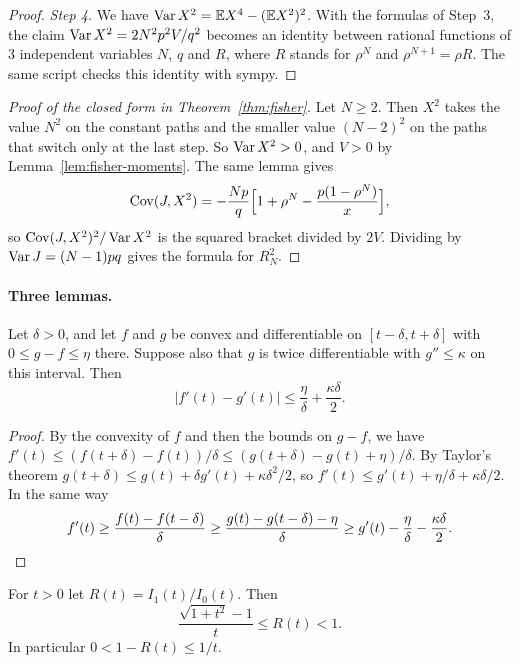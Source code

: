 \begin{proof}
\emph{Step 4.} We have $\operatorname{Var} X^2=\mathbb{E} X^4-(\mathbb{E} X^2)^2$. With the formulas of
Step~3, the claim $\operatorname{Var} X^2=2N^2p^2V/q^2$ becomes an identity between
rational functions of 3 independent variables $N$, $q$ and $R$, where $R$
stands for $\rho^N$ and $\rho^{N+1}=\rho R$. The same script checks this
identity with sympy.
\end{proof}

\begin{proof}[Proof of the closed form in Theorem~\ref{thm:fisher}]
Let $N\ge2$. Then $X^2$ takes the value $N^2$ on the constant paths and the
smaller value $(N-2)^2$ on the paths that switch only at the last step. So
$\operatorname{Var} X^2>0$, and $V>0$ by Lemma~\ref{lem:fisher-moments}. The same lemma
gives
\[
 \operatorname{Cov}(J,X^2)=-\frac{Np}q\Bigl[1+\rho^N-\frac{p(1-\rho^N)}x\Bigr],
\]
so $\operatorname{Cov}(J,X^2)^2/\operatorname{Var} X^2$ is the squared bracket divided by $2V$. Dividing
by $\operatorname{Var} J=(N-1)pq$ gives the formula for $R^2_N$.
\end{proof}

\paragraph{Three lemmas.}

\begin{lemma}[convexity]\label{lem:fisher-convex}
Let $\delta>0$, and let $f$ and $g$ be convex and differentiable on
$[t-\delta,t+\delta]$ with $0\le g-f\le\eta$ there. Suppose also that $g$ is
twice differentiable with $g''\le\kappa$ on this interval. Then
\[
 \lvert f'(t)-g'(t)\rvert\le\frac\eta\delta+\frac{\kappa\delta}2 .
\]
\end{lemma}

\begin{proof}
By the convexity of $f$ and then the bounds on $g-f$, we have
$f'(t)\le(f(t+\delta)-f(t))/\delta\le(g(t+\delta)-g(t)+\eta)/\delta$. By
Taylor's theorem $g(t+\delta)\le g(t)+\delta g'(t)+\kappa\delta^2/2$, so
$f'(t)\le g'(t)+\eta/\delta+\kappa\delta/2$. In the same way
\[
 f'(t)\ge\frac{f(t)-f(t-\delta)}\delta\ge\frac{g(t)-g(t-\delta)-\eta}\delta
 \ge g'(t)-\frac\eta\delta-\frac{\kappa\delta}2 .\qedhere
\]
\end{proof}

\begin{lemma}\label{lem:fisher-bessel}
For $t>0$ let $R(t)=I_1(t)/I_0(t)$. Then
\[
 \frac{\sqrt{1+t^2}-1}t\le R(t)<1 .
\]
In particular $0<1-R(t)\le1/t$.
\end{lemma}

